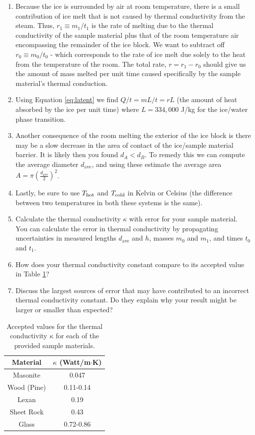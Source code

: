 \begin{enumerate}
\begin{enumerate}
		\item Because the ice is surrounded by air at room temperature, there is a small contribution of ice melt that is not caused by thermal conductivity from the steam.  Thus, $r_{1} \equiv m_{1}/t_{1}$ is the rate of melting due to the thermal conductivity of the sample material plus that of the room temperature air encompassing the remainder of the ice block.  We want to subtract off $r_{0} \equiv m_{0}/t_{0}$ - which corresponds to the rate of ice melt due solely to the heat from the temperature of the room.  The total rate, $r = r_{1} - r_{0}$ should give us the amount of mass melted per unit time caused specifically by the sample material's thermal conduction.
		\item Using Equation \ref{eq:latent} we find $Q/t = mL/t = rL$ (the amount of heat absorbed by the ice per unit time) where $L = 334,000$ J/kg for the ice/water phase transition.
		\item Another consequence of the room melting the exterior of the ice block is there may be a slow decrease in the area of contact of the ice/sample material barrier.  It is likely then you found $d_A < d_B$.  To remedy this we can compute the average diameter $d_\text{ave}$, and using these estimate the average area $A =\pi \left ( \frac{d_\text{ave}}{2}\right )^2$.
		\item Lastly, be sure to use $T_{\rm hot}$ and $T_{\rm cold}$ in Kelvin or Celsius (the difference between two temperatures in both these systems is the same).
\item Calculate the thermal conductivity $\kappa$ with error for your sample material. You can calculate the error in thermal conductivity by propagating uncertainties in measured lengths $d_\text{ave}$ and $h$, masses $m_0$ and $m_1$, and times $t_0$ and $t_1$.
\item  How does your thermal conductivity constant compare to its accepted value in Table \ref{kvalues}?
\item  Discuss the largest sources of error that may have contributed to an incorrect thermal conductivity constant. Do they explain why your result might be larger or smaller than expected?


	\end{enumerate}
	\begin{table}
	\begin{center}
	\begin{tabular}{| c | c |}
	\hline
	Material & $\kappa$ (Watt/m$\cdot$K) \\
	\hline
	Masonite & 0.047 \\
	Wood (Pine) & 0.11-0.14 \\
	Lexan & 0.19 \\
	Sheet Rock & 0.43 \\
	Glass & 0.72-0.86 \\
	\hline
	\end{tabular}
	\end{center}
	\vspace{-0.5 cm}
	\caption{Accepted values for the thermal conductivity $\kappa$ for each of the provided sample materials.}
	\label{kvalues}
	\end{table}
\end{enumerate}

